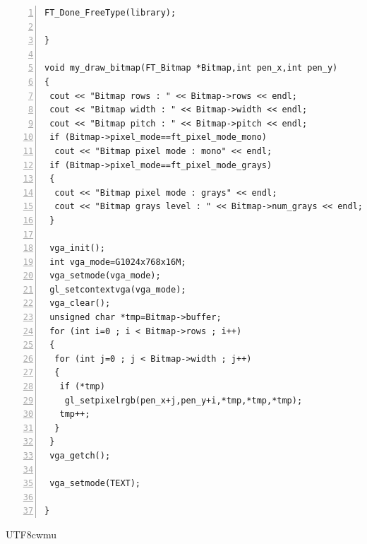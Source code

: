 \documentclass[12pt,a4]{article}
\begin{document}
\begin{CJK}{UTF8}{cwmu}
\begin{Verbatim}[commandchars=@\^?,numbers=left]
 FT_Done_FreeType(library);

}

void my_draw_bitmap(FT_Bitmap *Bitmap,int pen_x,int pen_y)
{
 cout << "Bitmap rows : " << Bitmap->rows << endl;
 cout << "Bitmap width : " << Bitmap->width << endl;
 cout << "Bitmap pitch : " << Bitmap->pitch << endl;
 if (Bitmap->pixel_mode==ft_pixel_mode_mono)
  cout << "Bitmap pixel mode : mono" << endl;
 if (Bitmap->pixel_mode==ft_pixel_mode_grays)
 {
  cout << "Bitmap pixel mode : grays" << endl;
  cout << "Bitmap grays level : " << Bitmap->num_grays << endl;
 }

 vga_init();
 int vga_mode=G1024x768x16M;
 vga_setmode(vga_mode);
 gl_setcontextvga(vga_mode);
 vga_clear();
 unsigned char *tmp=Bitmap->buffer;
 for (int i=0 ; i < Bitmap->rows ; i++)
 {
  for (int j=0 ; j < Bitmap->width ; j++)
  {
   if (*tmp)
    gl_setpixelrgb(pen_x+j,pen_y+i,*tmp,*tmp,*tmp);
   tmp++;
  }
 }
 vga_getch();

 vga_setmode(TEXT);

}
\end{Verbatim}
\end{CJK}{UTF8}{cwmu}
\end{document}
